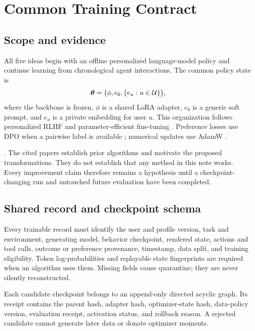 \section{Common Training Contract}
\label{sec:common}

\subsection{Scope and evidence}

All five ideas begin with an offline personalized language-model policy and
continue learning from chronological agent interactions.  The common policy
state is
\begin{equation}
  \bm{\theta} = \bigl(\phi,e_0,\{e_u:u\in\mathcal{U}\}\bigr),
  \label{eq:common-state}
\end{equation}
where the backbone is frozen, $\phi$ is a shared LoRA adapter, $e_0$ is a
generic soft prompt, and $e_u$ is a private embedding for user $u$.
This organization follows personalized RLHF and parameter-efficient
fine-tuning \citep{li2024personalized,hu2022lora}.  Preference losses use DPO
when a pairwise label is available \citep{rafailov2023dpo}; numerical updates
use AdamW \citep{loshchilov2019adamw}.

\Evidence.  The cited papers establish prior algorithms and motivate the
proposed transformations.  They do not establish that any method in this note
works.  Every improvement claim therefore remains a hypothesis until a
checkpoint-changing run and untouched future evaluation have been completed.

\subsection{Shared record and checkpoint schema}

Every trainable record must identify the user and profile version, task and
environment, generating model, behavior checkpoint, rendered state, actions
and tool calls, outcome or preference provenance, timestamp, data split, and
training eligibility.  Token log-probabilities and replayable state
fingerprints are required when an algorithm uses them.  Missing fields cause
quarantine; they are never silently reconstructed.

Each candidate checkpoint belongs to an append-only directed acyclic graph.
Its receipt contains the parent hash, adapter hash, optimizer-state hash,
data-policy version, evaluation receipt, activation status, and rollback
reason.  A rejected candidate cannot generate later data or donate optimizer
moments.

